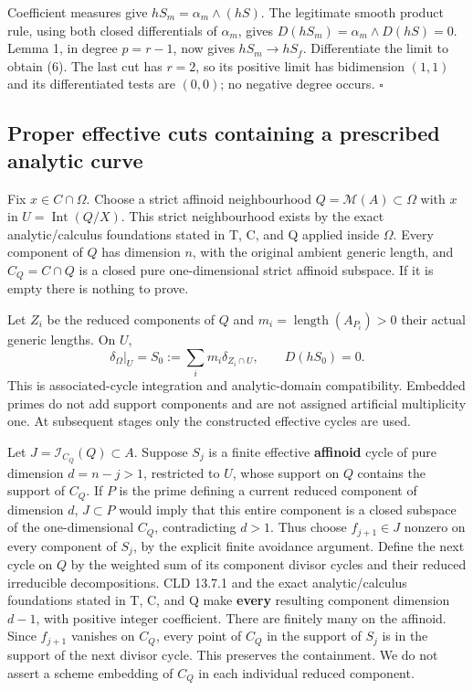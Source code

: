 \documentclass[
  10pt,
]{article}
\begin{document}
Coefficient measures give \(hS_m=\alpha_m\wedge(hS)\). The legitimate
smooth product rule, using both closed differentials of \(\alpha_m\),
gives \(D(hS_m)=\alpha_m\wedge D(hS)=0\). Lemma 1, in degree \(p=r-1\),
now gives \(hS_m\to hS_f\). Differentiate the limit to obtain (6). The
last cut has \(r=2\), so its positive limit has bidimension \((1,1)\)
and its differentiated tests are \((0,0)\); no negative degree occurs.
\(\square\)

\subsection{Proper effective cuts containing a prescribed analytic
curve}\label{proper-effective-cuts-containing-a-prescribed-analytic-curve}

Fix \(x\in C\cap\Omega\). Choose a strict affinoid neighbourhood
\(Q=\mathcal M(A)\subset\Omega\) with \(x\) in
\(U=\operatorname{Int}(Q/X)\). This strict neighbourhood exists by the
exact analytic/calculus foundations stated in T, C, and Q applied inside
\(\Omega\). Every component of \(Q\) has dimension \(n\), with the
original ambient generic length, and \(C_Q=C\cap Q\) is a closed pure
one-dimensional strict affinoid subspace. If it is empty there is
nothing to prove.

Let \(Z_i\) be the reduced components of \(Q\) and
\(m_i=\operatorname{length}(A_{P_i})>0\) their actual generic lengths.
On \(U\), \[
 \delta_\Omega|_U=S_0:=\sum_i m_i\delta_{Z_i\cap U},
 \qquad D(hS_0)=0.                                       \tag{10}
\] This is associated-cycle integration and analytic-domain
compatibility. Embedded primes do not add support components and are not
assigned artificial multiplicity one. At subsequent stages only the
constructed effective cycles are used.

Let \(J=\mathcal I_{C_Q}(Q)\subset A\). Suppose \(S_j\) is a finite
effective \textbf{affinoid} cycle of pure dimension \(d=n-j>1\),
restricted to \(U\), whose support on \(Q\) contains the support of
\(C_Q\). If \(P\) is the prime defining a current reduced component of
dimension \(d\), \(J\subset P\) would imply that this entire component
is a closed subspace of the one-dimensional \(C_Q\), contradicting
\(d>1\). Thus choose \(f_{j+1}\in J\) nonzero on every component of
\(S_j\), by the explicit finite avoidance argument. Define the next
cycle on \(Q\) by the weighted sum of its component divisor cycles and
their reduced irreducible decompositions. CLD 13.7.1 and the exact
analytic/calculus foundations stated in T, C, and Q make \textbf{every}
resulting component dimension \(d-1\), with positive integer
coefficient. There are finitely many on the affinoid. Since \(f_{j+1}\)
vanishes on \(C_Q\), every point of \(C_Q\) in the support of \(S_j\) is
in the support of the next divisor cycle. This preserves the
containment. We do not assert a scheme embedding of \(C_Q\) in each
individual reduced component.
\end{document}
